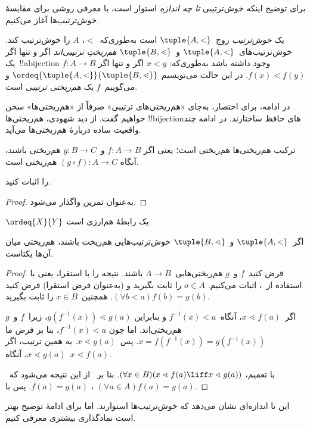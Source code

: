 \documentclass[../../../include/open-logic-section]{subfiles}
\begin{document}

برای توضیح اینکه خوش‌ترتیبی \emph{تا چه اندازه} استوار است، با معرفی روشی
برای مقایسهٔ خوش‌ترتیب‌ها آغاز می‌کنیم.

\begin{defn}
یک \emph{خوش‌ترتیب} زوج~$\tuple{A,<}$ است به‌طوری‌که~$<$، $A$ را
خوش‌ترتیب کند. خوش‌ترتیب‌های~$\tuple{A,<}$ و~$\tuple{B,\lessdot}$
\emph{هم‌ریختِ ترتیبی‌اند} اگر و تنها اگر یک~!!a{bijection}
$f \colon A \to B$ وجود داشته باشد به‌طوری‌که: $x<y$ اگر و تنها اگر
$f(x) \lessdot f(y)$. در این حالت می‌نویسیم
$\ordeq{\tuple{A,<}}{\tuple{B,\lessdot}}$ و می‌گوییم~$f$ یک
\emph{هم‌ریختی ترتیبی} است.
\end{defn}
\noindent
در ادامه، برای اختصار، به‌جای «هم‌ریختی‌های ترتیبی» صرفاً از
«هم‌ریختی‌ها» سخن خواهیم گفت. از دید شهودی، هم‌ریختی‌ها
!!{bijection}های حافظ ساختارند. در ادامه چند واقعیت ساده دربارهٔ
هم‌ریختی‌ها می‌آید.

\begin{lem}
ترکیب هم‌ریختی‌ها هم‌ریختی است؛ یعنی اگر
$f \colon A \to B$ و~$g \colon B \to C$ هم‌ریختی باشند، آنگاه
$(g \circ f) \colon A \to C$ هم‌ریختی است.
\end{lem}
\begin{prob}
	 را اثبات کنید.
\end{prob}
\begin{proof}
به‌عنوان تمرین واگذار می‌شود.
\end{proof}
\begin{cor}
	$\ordeq{X}{Y}$ یک رابطهٔ هم‌ارزی است.
\end{cor}
\begin{prop}
اگر~$\tuple{A,<}$ و~$\tuple{B,\lessdot}$ خوش‌ترتیب‌هایی هم‌ریخت باشند،
هم‌ریختی میان آن‌ها یکتاست.
\end{prop}

\begin{proof}
فرض کنید~$f$ و~$g$ هم‌ریختی‌هایی~$A \to B$ باشند. نتیجه را با استقرا،
یعنی با استفاده از~، اثبات می‌کنیم.
$a\in A$ را ثابت بگیرید و (به‌عنوان فرض استقرا) فرض کنید
$(\forall b<a)f(b)=g(b)$. همچنین~$x\in B$ را ثابت بگیرید.

اگر~$x \lessdot f(a)$، آنگاه~$f^{-1}(x)<a$ و بنابراین
$g(f^{-1}(x)) \lessdot g(a)$، زیرا~$f$ و~$g$ هم‌ریختی‌اند. اما چون
$f^{-1}(x)<a$، بنا بر فرض ما
$x=f(f^{-1}(x))=g(f^{-1}(x))$. پس~$x \lessdot g(a)$. به همین ترتیب، اگر
$x \lessdot g(a)$، آنگاه~$x \lessdot f(a)$.

با تعمیم، $(\forall x \in B)(x \lessdot f(a) \liff x \lessdot g(a))$.
بنا بر~ از
این نتیجه می‌شود که~$f(a)=g(a)$. پس با
، $(\forall a \in A)f(a)=g(a)$.
\end{proof}\noindent
این تا اندازه‌ای نشان می‌دهد که خوش‌ترتیب‌ها استوارند. اما برای ادامهٔ
توضیح بهتر است نمادگذاری بیشتری معرفی کنیم.
\end{document}
